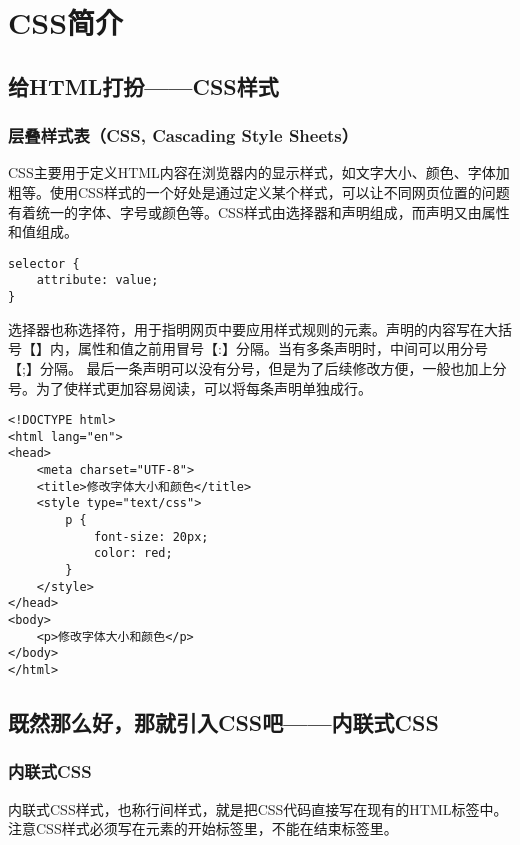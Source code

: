 \chapter{CSS简介}

\section{给HTML打扮——CSS样式}

\subsection{层叠样式表（CSS, Cascading Style Sheets）}

CSS主要用于定义HTML内容在浏览器内的显示样式，如文字大小、颜色、字体加粗等。使用CSS样式的一个好处是通过定义某个样式，可以让不同网页位置的问题有着统一的字体、字号或颜色等。CSS样式由选择器和声明组成，而声明又由属性和值组成。 \\

\begin{lstlisting}[style=htmlcssjs]
selector {
    attribute: value;
}
\end{lstlisting}

选择器也称选择符，用于指明网页中要应用样式规则的元素。声明的内容写在大括号【{}】内，属性和值之前用冒号【:】分隔。当有多条声明时，中间可以用分号【;】分隔。 最后一条声明可以没有分号，但是为了后续修改方便，一般也加上分号。为了使样式更加容易阅读，可以将每条声明单独成行。

\begin{lstlisting}[style=htmlcssjs, title=修改字体大小和颜色]
<!DOCTYPE html>
<html lang="en">
<head>
    <meta charset="UTF-8">
    <title>修改字体大小和颜色</title>
    <style type="text/css">
        p {
            font-size: 20px;
            color: red;
        }
    </style>
</head>
<body>
    <p>修改字体大小和颜色</p>
</body>
</html>
\end{lstlisting}

\newpage

\section{既然那么好，那就引入CSS吧——内联式CSS}

\subsection{内联式CSS}

内联式CSS样式，也称行间样式，就是把CSS代码直接写在现有的HTML标签中。注意CSS样式必须写在元素的开始标签里，不能在结束标签里。 \\


